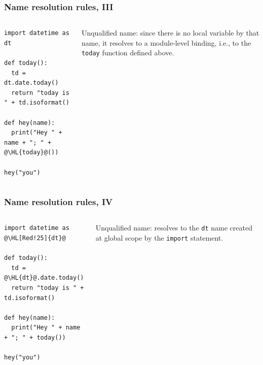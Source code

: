 \documentclass[english,serif,mathserif,xcolor=pdftex,dvipsnames,table]{beamer}
\begin{document}
\begin{frame}[fragile]
  \frametitle{Name resolution rules, III}
  \begin{columns}
    \begin{column}[t]{0.6\linewidth}
\begin{lstlisting}
import datetime as dt

def today():
  td = dt.date.today()
  return "today is " + td.isoformat()

def hey(name):
  print("Hey " + name + "; " + @\HL{today}@())

hey("you")
\end{lstlisting}
    \end{column}
    \begin{column}[t]{0.4\linewidth}
      \raggedleft
      Unqualified name: since there is no local variable by that name,
      it resolves to a module-level binding, i.e., to the
      \texttt{today} function defined above.
    \end{column}
  \end{columns}
\end{frame}


\begin{frame}[fragile]
  \frametitle{Name resolution rules, IV}
  \begin{columns}
    \begin{column}[t]{0.6\linewidth}
\begin{lstlisting}
import datetime as @\HL[Red!25]{dt}@

def today():
  td = @\HL{dt}@.date.today()
  return "today is " + td.isoformat()

def hey(name):
  print("Hey " + name + "; " + today())

hey("you")
\end{lstlisting}
    \end{column}
    \begin{column}[t]{0.4\linewidth}
      \raggedleft
      Unqualified name: resolves to the \texttt{dt} name created at global scope by the \texttt{import} statement.
    \end{column}
  \end{columns}
\end{frame}
\end{document}
